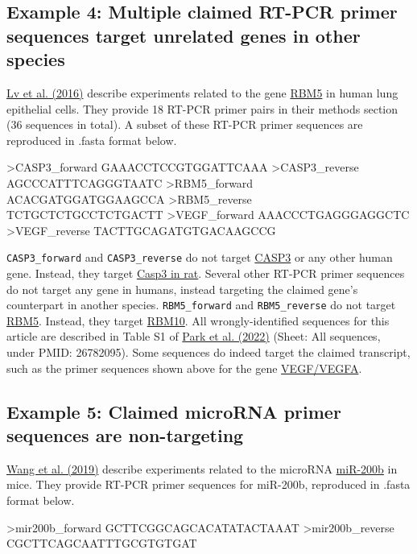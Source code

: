 \documentclass[letterpaper, 12pt]{article}
\begin{document}
\subsection*{Example 4: Multiple claimed RT-PCR primer sequences target unrelated genes in other species}

\href{https://doi.org/10.3892/or.2016.4551}{Lv et al. (2016)} describe experiments related to the gene \href{https://www.ncbi.nlm.nih.gov/gene/10181}{RBM5} in human lung epithelial cells. They provide 18 RT-PCR primer pairs in their methods section (36 sequences in total). A subset of these RT-PCR primer sequences are reproduced in .fasta format below.

\begin{verbatim*}
>CASP3_forward
GAAACCTCCGTGGATTCAAA
>CASP3_reverse
AGCCCATTTCAGGGTAATC
>RBM5_forward
ACACGATGGATGGAAGCCA
>RBM5_reverse
TCTGCTCTGCCTCTGACTT
>VEGF_forward
AAACCCTGAGGGAGGCTC
>VEGF_reverse
TACTTGCAGATGTGACAAGCCG
\end{verbatim*}

\verb|CASP3_forward| and \verb|CASP3_reverse| do not target \href{https://www.ncbi.nlm.nih.gov/gene/836}{CASP3} or any other human gene. Instead, they target \href{https://www.ncbi.nlm.nih.gov/gene/25402}{Casp3 in rat}. Several other RT-PCR primer sequences do not target any gene in humans, instead targeting the claimed gene's counterpart in another species. \verb|RBM5_forward| and \verb|RBM5_reverse| do not target \href{https://www.ncbi.nlm.nih.gov/gene/10181}{RBM5}. Instead, they target \href{https://www.ncbi.nlm.nih.gov/gene/8241}{RBM10}. All wrongly-identified sequences for this article are described in Table S1 of \href{https://doi.org/10.26508/lsa.202101203}{Park et al. (2022)} (Sheet: All sequences, under PMID: 26782095). Some sequences do indeed target the claimed transcript, such as the primer sequences shown above for the gene \href{https://www.ncbi.nlm.nih.gov/gene/7422}{VEGF/VEGFA}.

\subsection*{Example 5: Claimed microRNA primer sequences are non-targeting}

\href{}{Wang et al. (2019)} describe experiments related to the microRNA \href{https://www.ncbi.nlm.nih.gov/gene/387243}{miR-200b} in mice. They provide RT-PCR primer sequences for miR-200b, reproduced in .fasta format below.

\begin{verbatim*}
>mir200b_forward
GCTTCGGCAGCACATATACTAAAT
>mir200b_reverse
CGCTTCAGCAATTTGCGTGTGAT
\end{verbatim*}
\end{document}
